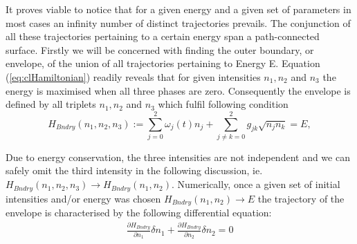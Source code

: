 \documentclass[9pt,twocolumn,twoside]{osajnl}
\begin{document}
It proves viable to notice that for a given energy and a given set of parameters in most cases an infinity number of distinct trajectories prevails.
The conjunction of all these trajectories pertaining to a certain energy
span a path-connected surface.
Firstly we will be concerned with finding the outer boundary, or envelope, of the union of all trajectories pertaining to Energy 
E.
Equation (\ref{eq:clHamiltonian}) readily reveals that for given intensities 
$n_1,n_2$ and $n_3$ the energy is maximised when all three phases
are zero. Consequently the envelope is defined by all triplets
$n_1,n_2$ and $n_3$ which fulfil following condition
\begin{equation}
H_{Bndry}(n_1,n_2,n_3) := \sum_{j=0}^{2} \omega_{j}(t) n_{j}  
+ \sum_{j \neq k = 0}^{2} g_{jk} \sqrt{n_{j} n_{k}} = E,	
\end{equation}

Due to energy conservation, the three intensities are not 
independent and we can safely omit the third intensity in the 
following discussion, ie. 
$H_{Bndry}(n_1,n_2,n_3) \rightarrow H_{Bndry}(n_1,n_2)$.
Numerically, once a given set of initial intensities and/or
energy was chosen $H_{Bndry}(n_1,n_2) \rightarrow E$ the 
trajectory of the envelope is characterised by the following differential equation:    
\begin{eqnarray}
\frac{\partial H_{Bndry}}{\partial n_1}\delta n_1 + 
\frac{\partial H_{Bndry}}{\partial n_2}\delta n_2 = 0
\end{eqnarray}
\end{document}
